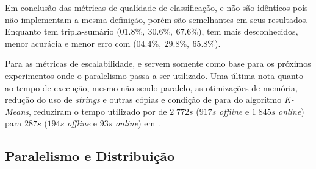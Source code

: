 


Em conclusão das métricas de qualidade de classificação,  e \serial
não são idênticos pois não implementam a mesma definição, porém são semelhantes
em seus resultados.
Enquanto  tem tripla-sumário 
($01.8\%,\: 30.6\%,\: 67.6\%$), \serial tem
mais desconhecidos, menor acurácia e menor erro com 
($04.4\%,\: 29.8\%,\: 65.8\%$).

Para as métricas de escalabilidade,  e \serial servem somente como base
para os próximos experimentos onde o paralelismo passa a ser utilizado.
Uma última nota quanto ao tempo de execução, mesmo não sendo paralelo, as
otimizações de memória, redução do uso de \emph{strings} e outras cópias e
condição de para do algoritmo \emph{K-Means}, reduziram o tempo utilizado por
 de $2\;772s$ ($917s$ \emph{offline} e $1\;845s$ \emph{online}) para
$287s$ ($194s$ \emph{offline} e $93s$ \emph{online}) em \serial.

\subsection{Paralelismo e Distribuição}


